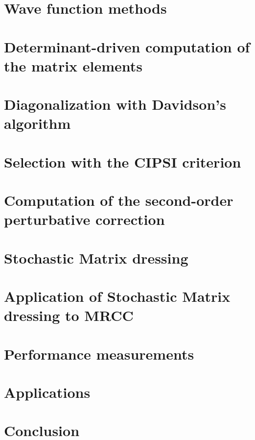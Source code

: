 \documentclass[12pt,a4paper]{report}
\begin{document}
\chapter{Wave function methods}
\minitoc


\chapter{Determinant-driven computation of the matrix elements}
\minitoc


\chapter{Diagonalization with Davidson's algorithm}
\minitoc


\chapter{Selection with the CIPSI criterion}
\minitoc


\chapter{Computation of the second-order perturbative correction}
\minitoc


\chapter{Stochastic Matrix dressing}
\minitoc


\chapter{Application of Stochastic Matrix dressing to MRCC}
\minitoc


\chapter{Performance measurements}
\minitoc


\chapter{Applications}
\minitoc


\chapter{Conclusion}
\end{document}
